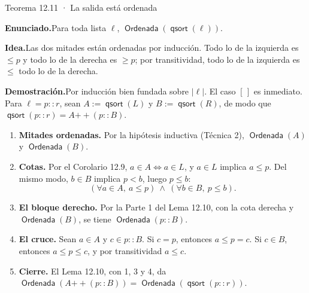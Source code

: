 \documentclass[11pt,a4paper]{article}
\newcommand{\campo}[1]{\par\smallskip\noindent\textbf{#1}\enspace}
\newcommand{\enunciado}{\campo{Enunciado.}}
\newcommand{\idea}{\campo{Idea.}}
\newcommand{\prueba}{\campo{Demostración.}}
\newcommand{\concat}{\mathbin{+\!\!+}}
\newcommand{\qs}{\operatorname{\mathsf{qsort}}}
\newcommand{\len}[1]{\lvert #1\rvert}
\newcommand{\Sorted}{\operatorname{\mathsf{Ordenada}}}
\begin{document}
\begin{resultado}{Teorema 12.11 · La salida está ordenada}
\enunciado Para toda lista \(\ell\), \(\Sorted(\qs(\ell))\).

\idea Las dos mitades están ordenadas por inducción. Todo lo de la izquierda
es \(\leq p\) y todo lo de la derecha es \(\geq p\); por transitividad, todo
lo de la izquierda es \(\leq\) todo lo de la derecha.

\prueba Por inducción bien fundada sobre \(\len\ell\). El caso \([\,]\) es
inmediato. Para \(\ell=p::r\), sean \(A:=\qs(L)\) y \(B:=\qs(R)\), de modo que
\(\qs(p::r)=A\concat(p::B)\).
\begin{enumerate}
  \item \textbf{Mitades ordenadas.} Por la hipótesis inductiva (Técnica 2),
    \(\Sorted(A)\) y \(\Sorted(B)\).
  \item \textbf{Cotas.} Por el Corolario 12.9, \(a\in A\iff a\in L\), y
    \(a\in L\) implica \(a\leq p\). Del mismo modo, \(b\in B\) implica
    \(p<b\), luego \(p\leq b\):
    \[
    (\forall a\in A,\ a\leq p)\ \wedge\ (\forall b\in B,\ p\leq b).
    \]
  \item \textbf{El bloque derecho.} Por la Parte 1 del Lema 12.10, con la
    cota derecha y \(\Sorted(B)\), se tiene \(\Sorted(p::B)\).
  \item \textbf{El cruce.} Sean \(a\in A\) y \(c\in p::B\). Si \(c=p\),
    entonces \(a\leq p=c\). Si \(c\in B\), entonces \(a\leq p\leq c\), y por
    transitividad \(a\leq c\).
  \item \textbf{Cierre.} El Lema 12.10, con 1, 3 y 4, da
    \(\Sorted(A\concat(p::B))=\Sorted(\qs(p::r))\).
\end{enumerate}
\end{resultado}

\begin{center}
\end{center}
\end{document}
